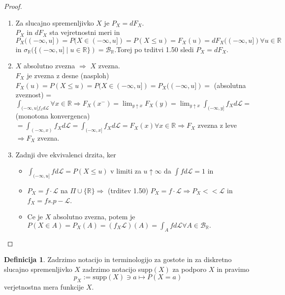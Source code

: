 \documentclass[a4paper,12pt]{article}
\theoremstyle{definition} %
\newtheorem{definicija}{Definicija}[section]
\theoremstyle{plain} %
\newcommand{\R}{\mathbb{R}}
\newcommand{\B}{\mathcal{B}}
\newcommand{\Le}{\mathcal{L}}
\begin{document}
        \begin{proof}
            \begin{enumerate}
                \item Za slucajno spremenljivko $X$ je $P_X = dF_X$. \\
                 $P_X$ in $dF_X$ sta vejretnostni meri in $P_X((-\infty, u]) = P(X \in (-\infty, u]) = P(X \leq u) = F_X(u) = dF_X((-\infty, u]) \forall u \in \R$ in $\sigma_\R(\{(-\infty, u] \mid u \in \R\}) = \B_\R$.Torej po trditvi 1.50 sledi $P_X = dF_X$.
                
                \item $X$ absolutno zvezna $\Rightarrow$ $X$ zvezna. \\
                $F_X$ je zvezna z desne (nasploh) \\
                $F_X(u) = P(X \leq u) = P(X \in (-\infty, u]) = P_X((-\infty, u]) =$ (absolutna zveznost) = $\int_{(-\infty, u]f_xd\Le} \forall x \in \R \Rightarrow F_X(x^-) = \lim_{y\uparrow x}F_X(y) = \lim_{y\uparrow x}\int_{(-\infty, y]}f_Xd\Le =$ (monotona konvergenca) $= \int_{(-\infty, x)}f_Xd\Le = \int_{(-\infty, x]}f_Xd\Le = F_X(x) \forall x \in \R \Rightarrow F_X$ zvezna z leve$ \Rightarrow F_X$ zvezna.

                \item Zadnji dve ekvivalenci drzita, ker \\
                \begin{itemize}
                    \item $\int_{(-\infty, u]}fd\Le = P(X \leq u)$ v limiti za $u \uparrow \infty$ da $\int fd\Le = 1$ in 
                    \item $P_X = f \cdot \Le$ na $\Pi \cup \{\R\} \Rightarrow$ (trditev 1.50) $P_X = f \cdot \Le \Rightarrow P_X << \Le$ in $f_X = f s.p-\Le$.
                    \item Ce je $X$ absolutno zvezna, potem je $P(X\in A) = P_X(A) = (f_X\Le)(A) = \int_Afd\Le \forall A \in \B_\R.$
                \end{itemize}

                      
            \end{enumerate}
        \end{proof}

        \begin{definicija}
            Zadrzimo notacijo in terminologijo za gostote in za diskretno slucajno spremenljivko $X$ zadrzimo notacijo supp$(X)$ za podporo $X$ in pravimo 
            $$
                p_X := \text{supp}(X)\ni a \mapsto P(X = a)
            $$
            verjetnostna mera funkcije $X$.
        \end{definicija}
\end{document}
